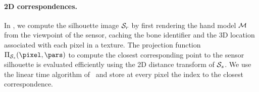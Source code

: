 \paragraph*{2D correspondences.}
In , we compute the silhouette image $\mathcal{S}_{r}$ by first rendering the hand model $\mathcal{M}$ from the viewpoint of the sensor, caching the bone identifier and the 3D location associated with each pixel in a texture.
The projection function $\proj_{\SilhoSensor}(\pixel,\pars)$ to compute the
 closest corresponding point to the sensor silhouette is evaluated efficiently using the 2D distance transform of $\mathcal{S}_{s}$.
 We use the linear time algorithm of~\cite{felzenszwalb_12} and store at every pixel the index to the closest correspondence.




